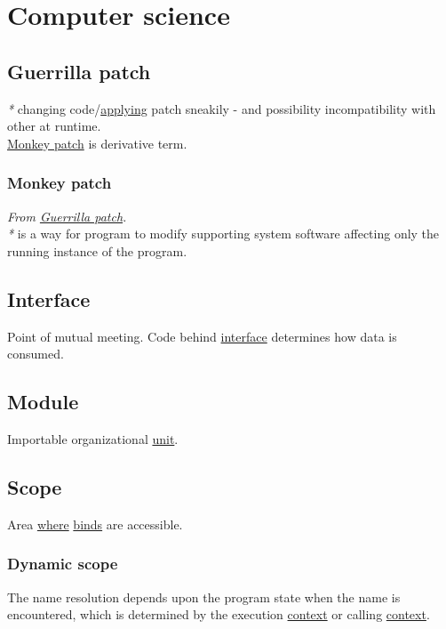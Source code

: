 \documentclass[a4paper,14pt,oneside]{book}
\begin{document}
\chapter{Computer science}
\label{sec:org5f69784}
\section{\label{org2cc7e44}Guerrilla patch}
\label{sec:orgfcd11a9}
\emph{*} changing code/\hyperref[org8ea5731]{applying} patch sneakily - and possibility incompatibility with other at runtime.\\
\hyperref[org5ce2c1e]{Monkey patch} is derivative term.\\

\subsection{\label{org5ce2c1e}Monkey patch}
\label{sec:org55de640}
\emph{From \hyperref[org2cc7e44]{Guerrilla patch}.}\\

\emph{*} is a way for program to modify supporting system software affecting only the running instance of the program.\\

\section{\label{org881f69f}Interface}
\label{sec:org8537cba}
Point of mutual meeting. Code behind \hyperref[org881f69f]{interface} determines how data is consumed.\\

\section{\label{org4e5d47f}Module}
\label{sec:orgb7cc7e7}
Importable organizational \hyperref[org2f67cc5]{unit}.\\

\section{\label{orga3ec5be}Scope}
\label{sec:org6dc00ab}
Area \hyperref[org514c9de]{where} \hyperref[org32b6191]{binds} are accessible.\\

\subsection{\label{org7c26c1b}Dynamic scope}
\label{sec:orgfe47111}
The name resolution depends upon the program state when the name is encountered, which is determined by the execution \hyperref[orgbfccf2e]{context} or calling \hyperref[orgbfccf2e]{context}.\\
\end{document}
